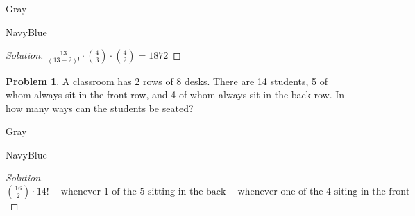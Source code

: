 \documentclass[12pt]{amsart}
\newcounter{problem_number}[section]
\theoremstyle{named}
\newenvironment{soln}
{\begin{color}{Gray}\begin{framed}\begin{color}{NavyBlue}\begin{proof}[Solution]
\doublespacing}
{\end{proof}\end{color}\end{framed}\end{color}}
\theoremstyle{definition}
\newtheorem{problem}{Problem}
\begin{document}
\begin{soln}
	\phantom{ }

    $\frac{13}{(13-2)!} \cdot {4 \choose 3} \cdot {4 \choose 2} = 1872$
\end{soln}

\phantom{ }

\phantom{ }

\phantom{ }

\phantom{ }

\phantom{ }

\begin{problem}
	A classroom has 2 rows of 8 desks. There are 14 students, 5 of whom always sit in the front row, and 4 of whom always sit in the back row. In how many ways can the students be seated?
\end{problem}

\begin{soln}
	\phantom{ }

    ${16 \choose 2} \cdot 14! - \text{whenever 1 of the 5 sitting in the back} - \text{whenever one of the 4 siting in the front}$
\end{soln}

\end{document}

